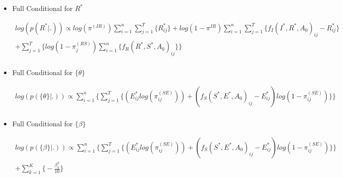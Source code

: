 \documentclass[12pt]{article}
\begin{document}
\begin{itemize}
    \item{Full Conditional for $R^*$}
    \begin{center}
    \begin{multline}
        \displaystyle
        log(p(R^*|.)) \propto log(\pi^{(IR)})\sum_{i=1}^n\sum_{j=1}^T\{R^*_{ij}\} + 
            log(1-\pi^{IR})\sum_{i=1}^n\sum_{j=1}^T\{ f_I(I^*, R^*, A_0)_{ij} - R^*_{ij}\}\\
            +   \sum_{j=1}^T\Big\{log(1-\pi_j^{(RS)})\sum_{i=1}^n\{f_R(R^*, S^*, A_0)_{ij}\}\Big\}\\ 
    \end{multline}
    \end{center}
    \item{Full Conditional for $\{\theta\}$}
    \begin{center}
    \begin{multline}
        \displaystyle
        log(p(\{\theta\}|.)) \propto \sum_{i=1}^n \bigg\{ \sum_{j=1}^T\Big\{
            (E^*_{ij}log(\pi_{ij}^{(SE)})) + (f_S(S^*, E^*, A_0)_{ij} - E^*_{ij})log(1-\pi_{ij}^{(SE)})\Big\}\bigg\} \\
    \end{multline}
    \end{center}

    \item{Full Conditional for $\{\beta\}$}
    \begin{center}
    \begin{multline}
        \displaystyle
        log(p(\{\beta\}|.)) \propto
            \sum_{i=1}^n \bigg\{ \sum_{j=1}^T\Big\{
            (E^*_{ij}log(\pi_{ij}^{(SE)})) + (f_S(S^*, E^*, A_0)_{ij} - E^*_{ij})log(1-\pi_{ij}^{(SE)})\Big\}\bigg\} \\
             + \sum_{k = 1}^K\bigg\{-\frac{\beta^2_k}{10}\bigg\}
    \end{multline}
    \end{center}


\end{itemize}
\end{document}

